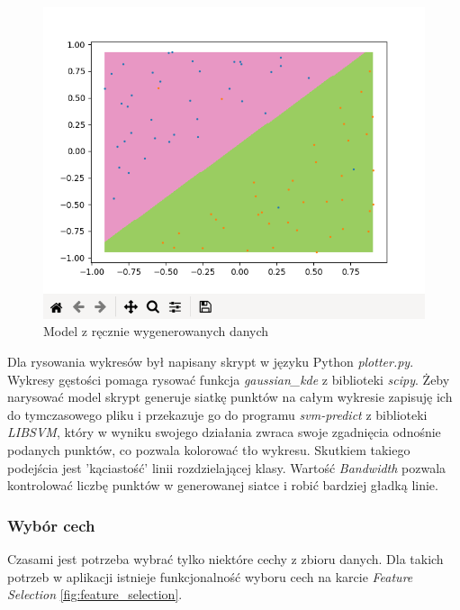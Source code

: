 \documentclass[paper=a4, fontsize=11pt]{scrartcl} %
\numberwithin{equation}{section} %
\numberwithin{figure}{section} %
\begin{document}
    \begin{figure}[H]
        \begin{center}
            \includegraphics[scale=0.65]{./img/gen_plot_model.png}
            \caption{Model z ręcznie wygenerowanych danych}
            \label{fig:gen_plot_model}
        \end{center}
    \end{figure}

    \par Dla rysowania wykresów był napisany skrypt w języku Python \textit{plotter.py}.
    Wykresy gęstości pomaga rysować funkcja \textit{gaussian\_kde} z biblioteki \textit{scipy}.
    Żeby narysować model skrypt generuje siatkę punktów na całym wykresie zapisuję ich do
    tymczasowego pliku i przekazuje go do programu \textit{svm-predict} z biblioteki
    \textit{LIBSVM}, który w wyniku swojego działania zwraca swoje zgadnięcia odnośnie podanych
    punktów, co pozwala kolorować tło wykresu. Skutkiem takiego podejścia jest 'kąciastość'
    linii rozdzielającej klasy. Wartość \textit{Bandwidth} pozwala kontrolować liczbę punktów w
    generowanej siatce i robić bardziej gładką linie.

\newpage
\subsubsection{Wybór cech}
    \par Czasami jest potrzeba wybrać tylko niektóre cechy z zbioru danych. Dla takich potrzeb
    w aplikacji istnieje funkcjonalność wyboru cech na karcie \textit{Feature Selection}
    \ref{fig:feature_selection}.
\end{document}
